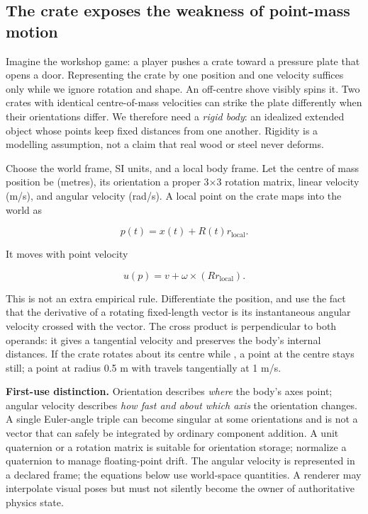 \subsection{The crate exposes the weakness of point-mass motion}\label{02-foundations-ii-ch039-the-crate-exposes-the-weakness-of-point-mass-motion}

\hypertarget{02-foundations-ii-ch039-the-crate-exposes-the-weakness-of-point-mass-motion}{}

Imagine the workshop game: a player pushes a crate toward a pressure plate that opens a door. Representing the crate by one position and one velocity suffices only while we ignore rotation and shape. An off-centre shove visibly spins it. Two crates with identical centre-of-mass velocities can strike the plate differently when their orientations differ. We therefore need a \emph{rigid body}: an idealized extended object whose points keep fixed distances from one another. Rigidity is a modelling assumption, not a claim that real wood or steel never deforms.

Choose the world frame, SI units, and a local body frame. Let the centre of mass position be  (metres), its orientation  a proper 3×3 rotation matrix, linear velocity  (m/s), and angular velocity  (rad/s). A local point  on the crate maps into the world as

\[
p(t)=x(t)+R(t)r_{\mathrm{local}}.
\]

It moves with point velocity

\[
u(p)=v+\omega\times(Rr_{\mathrm{local}}).
\]

This is not an extra empirical rule. Differentiate the position, and use the fact that the derivative of a rotating fixed-length vector is its instantaneous angular velocity crossed with the vector. The cross product is perpendicular to both operands: it gives a tangential velocity and preserves the body's internal distances. If the crate rotates about its centre while , a point at the centre stays still; a point at radius 0.5 m with  travels tangentially at 1 m/s.

\textbf{First-use distinction.} Orientation describes \emph{where} the body's axes point; angular velocity describes \emph{how fast and about which axis} the orientation changes. A single Euler-angle triple can become singular at some orientations and is not a vector that can safely be integrated by ordinary component addition. A unit quaternion or a rotation matrix is suitable for orientation storage; normalize a quaternion to manage floating-point drift. The angular velocity is represented in a declared frame; the equations below use world-space quantities. A renderer may interpolate visual poses but must not silently become the owner of authoritative physics state.

